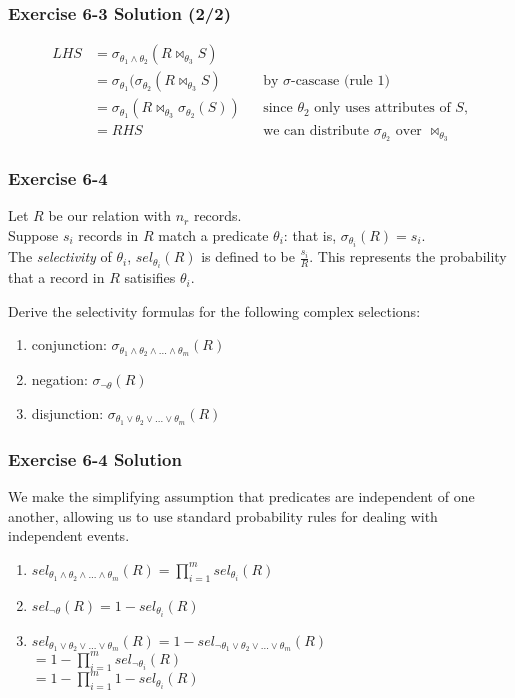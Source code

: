 \begin{frame}
\frametitle{Exercise 6-3 Solution (2/2)}

\begin{align*}
  LHS &= \sigma_{\theta_1 \land \theta_2}(R \bowtie_{\theta_3} S) \\
  &= \sigma_{\theta_1}(\sigma_{\theta_2}(R \bowtie_{\theta_3} S) && \text{by $\sigma$-cascase (rule 1)} \\
  &= \sigma_{\theta_1}(R \bowtie_{\theta_3} \sigma_{\theta_2}(S)) && \text{since $\theta_2$ only uses attributes of $S$,} \\
  &= RHS && \text{we can distribute $\sigma_{\theta_2}$ over $\bowtie_{\theta_3}$}
\end{align*}
\end{frame}


\begin{frame}
\frametitle{Exercise 6-4}

Let $R$ be our relation with $n_r$ records. \\
Suppose $s_i$ records in $R$ match a predicate $\theta_i$: that is, $\sigma_{\theta_i}(R) = s_i$. \\
The \textit{selectivity} of $\theta_i$, $sel_{\theta_i}(R)$ is defined to be $\frac{s_i}{R}$. This represents the probability that a record in $R$ satisifies $\theta_i$.

Derive the selectivity formulas for the following complex selections:

\begin{enumerate}
  \item conjunction: $\sigma_{\theta_1 \land \theta_2 \land ... \land \theta_m}(R)$
  \item negation: $\sigma_{\lnot\theta}(R)$
  \item disjunction: $\sigma_{\theta_1 \lor \theta_2 \lor ... \lor \theta_m}(R)$
\end{enumerate}

\end{frame}


\begin{frame}
\frametitle{Exercise 6-4 Solution}

We make the simplifying assumption that predicates are independent of one another, allowing us to use standard probability rules for dealing with independent events.

\begin{enumerate}
  \item $sel_{\theta_1 \land \theta_2 \land ... \land \theta_m}(R) = \prod_{i=1}^{m} sel_{\theta_i}(R)$
  \item $sel_{\lnot\theta}(R) = 1 - sel_{\theta_i}(R)$
  \item $sel_{\theta_1 \lor \theta_2 \lor ... \lor \theta_m}(R) = 1 - sel_{\lnot \theta_1 \lor \theta_2 \lor ... \lor \theta_m}(R)$ \\
    $ = 1 - \prod_{i=1}^{m} sel_{\lnot \theta_i}(R)$ \\
    $ = 1 - \prod_{i=1}^{m} 1 - sel_{\theta_i}(R)$
\end{enumerate}

\end{frame}


